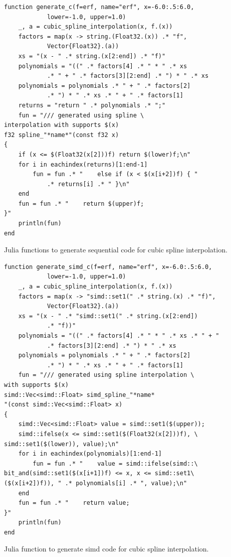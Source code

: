 \documentclass[a4paper, 11pt]{memoir}
\begin{document}
    \begin{listing}[ht]
        \begin{verbatim}
function generate_c(f=erf, name="erf", x=-6.0:.5:6.0,
            lower=-1.0, upper=1.0)
    _, a = cubic_spline_interpolation(x, f.(x))
    factors = map(x -> string.(Float32.(x)) .* "f",
            Vector{Float32}.(a))
    xs = "(x - " .* string.(x[2:end]) .* "f)"
    polynomials = "((" .* factors[4] .* " * " .* xs
            .* " + " .* factors[3][2:end] .* ") * " .* xs
    polynomials = polynomials .* " + " .* factors[2]
            .* ") * " .* xs .* " + " .* factors[1]
    returns = "return " .* polynomials .* ";"
    fun = "/// generated using spline \
interpolation with supports $(x)
f32 spline_"*name*"(const f32 x)
{
    if (x <= $(Float32(x[2]))f) return $(lower)f;\n"
    for i in eachindex(returns)[1:end-1]
        fun = fun .* "    else if (x < $(x[i+2])f) { "
            .* returns[i] .* " }\n"
    end
    fun = fun .* "    return $(upper)f;
}"
    println(fun)
end
        \end{verbatim}
        \caption{Julia functions to generate sequential code for cubic spline interpolation.}
        \label{lst:jl_code_gen}
    \end{listing}

    \begin{listing}[ht]
        \begin{verbatim}
function generate_simd_c(f=erf, name="erf", x=-6.0:.5:6.0,
            lower=-1.0, upper=1.0)
    _, a = cubic_spline_interpolation(x, f.(x))
    factors = map(x -> "simd::set1(" .* string.(x) .* "f)",
            Vector{Float32}.(a))
    xs = "(x - " .* "simd::set1(" .* string.(x[2:end])
            .* "f))"
    polynomials = "((" .* factors[4] .* " * " .* xs .* " + "
            .* factors[3][2:end] .* ") * " .* xs
    polynomials = polynomials .* " + " .* factors[2]
            .* ") * " .* xs .* " + " .* factors[1]
    fun = "/// generated using spline interpolation \
with supports $(x)
simd::Vec<simd::Float> simd_spline_"*name*
"(const simd::Vec<simd::Float> x)
{
    simd::Vec<simd::Float> value = simd::set1($(upper));
    simd::ifelse(x <= simd::set1($(Float32(x[2]))f), \
simd::set1($(lower)), value);\n"
    for i in eachindex(polynomials)[1:end-1]
        fun = fun .* "    value = simd::ifelse(simd::\
bit_and(simd::set1($(x[i+1])f) <= x, x <= simd::set1\
($(x[i+2])f)), " .* polynomials[i] .* ", value);\n"
    end
    fun = fun .* "    return value;
}"
    println(fun)
end
        \end{verbatim}
        \caption{Julia function to generate \gls{simd} code for cubic spline interpolation.}
        \label{lst:jl_code_gen_simd}
    \end{listing}
\end{document}
